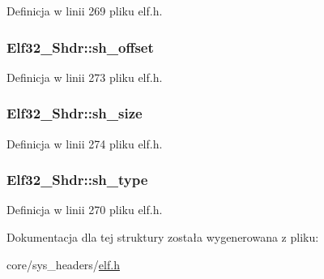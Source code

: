 Definicja w linii 269 pliku elf.\-h.

\hypertarget{struct_elf32___shdr_a6e37227a5777cddc0a9dbbb3c2598ec1}{
\subsubsection[{sh\-\_\-offset}]{ Elf32\-\_\-\-Shdr\-::sh\-\_\-offset}}\label{struct_elf32___shdr_a6e37227a5777cddc0a9dbbb3c2598ec1}


Definicja w linii 273 pliku elf.\-h.

\hypertarget{struct_elf32___shdr_a84dc67bb0ab65880bbcd74fbee722ff1}{
\subsubsection[{sh\-\_\-size}]{ Elf32\-\_\-\-Shdr\-::sh\-\_\-size}}\label{struct_elf32___shdr_a84dc67bb0ab65880bbcd74fbee722ff1}


Definicja w linii 274 pliku elf.\-h.

\hypertarget{struct_elf32___shdr_aab6c221dbd7e16987df41280fb915408}{
\subsubsection[{sh\-\_\-type}]{ Elf32\-\_\-\-Shdr\-::sh\-\_\-type}}\label{struct_elf32___shdr_aab6c221dbd7e16987df41280fb915408}


Definicja w linii 270 pliku elf.\-h.



Dokumentacja dla tej struktury została wygenerowana z pliku\-:\begin{DoxyCompactItemize}
\item 
core/sys\-\_\-headers/\hyperlink{elf_8h}{elf.\-h}\end{DoxyCompactItemize}
